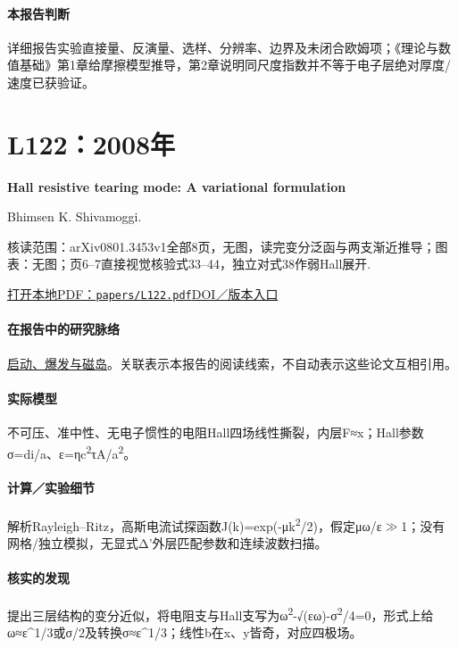 \documentclass[UTF8,a4paper,11pt,openany,fontset=fandol]{ctexbook}
\begin{document}
\paragraph{本报告判断}详细报告实验直接量、反演量、选样、分辨率、边界及未闭合欧姆项；《理论与数值基础》第1章给摩擦模型推导，第2章说明同尺度指数并不等于电子层绝对厚度/速度已获验证。

\section{L122：2008年}\label{paper:L122}

\textbf{Hall resistive tearing mode: A variational formulation}\citep{L122}\

Bhimsen K. Shivamoggi.

\textsf{核读范围：}arXiv0801.3453v1全部8页，无图，读完变分泛函与两支渐近推导；\textsf{图表：}无图；页6–7直接视觉核验式33–44，独立对式38作弱Hall展开.

\href{run:../papers/L122.pdf}{打开本地PDF：\texttt{papers/L122.pdf}}\quad\href{https://doi.org/10.1209/0295-5075/83/55002}{DOI／版本入口}

\paragraph{在报告中的研究脉络}\hyperref[story:onset]{启动、爆发与磁岛}。关联表示本报告的阅读线索，不自动表示这些论文互相引用。

\paragraph{实际模型}不可压、准中性、无电子惯性的电阻Hall四场线性撕裂，内层F≈x；Hall参数σ=di/a、ε=ηc\textsuperscript{2}τA/a\textsuperscript{2}。

\paragraph{计算／实验细节}解析Rayleigh–Ritz，高斯电流试探函数J(k)=exp(-μk\textsuperscript{2}/2)，假定μω/ε\ensuremath{\gg}1；没有网格/独立模拟，无显式Δ'外层匹配参数和连续波数扫描。

\paragraph{核实的发现}提出三层结构的变分近似，将电阻支与Hall支写为ω\textsuperscript{2}-√(εω)-σ\textsuperscript{2}/4=0，形式上给ω≈ε\textasciicircum{}1/3或σ/2及转换σ≈ε\textasciicircum{}1/3；线性b在x、y皆奇，对应四极场。
\end{document}

